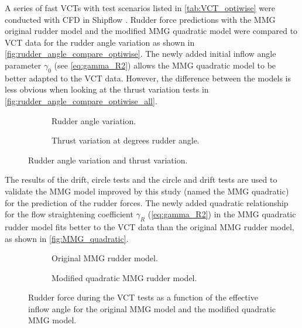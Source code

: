 \noindent A series of fast VCTs with test scenarios listed in \autoref{tab:VCT_optiwise} were conducted with CFD in Shipflow \citep{alexanderssonVirtualCaptiveTests2017}. Rudder force predictions with the MMG original rudder model and the modified MMG quadratic model were compared to VCT data for the rudder angle variation as shown in \autoref{fig:rudder_angle_compare_optiwise}. The newly added initial inflow angle parameter $\gamma_0$ (see \autoref{eq:gamma_R2}) allows the MMG quadratic model to be better adapted to the VCT data. However, the difference between the models is less obvious when looking at the thrust variation tests in \autoref{fig:rudder_angle_compare_optiwise_all}.
\begin{figure}[h]
     \centering
     \begin{subfigure}[b]{0.49\textwidth}
         \centering
         
        \caption{Rudder angle variation.}
        \label{fig:rudder_angle_compare_optiwise}
     \end{subfigure}
     \hfill
     \begin{subfigure}[b]{0.49\textwidth}
         \centering
         
        \caption{Thrust variation at  degrees rudder angle.}
        \label{fig:thrust_variation_optiwise}
     \end{subfigure}
    \caption{Rudder angle variation and thrust variation.}
    \label{fig:rudder_angle_compare_optiwise_all}
\end{figure}
\FloatBarrier

The results of the drift, circle tests and the circle and drift tests are used to validate the MMG model improved by this study (named the MMG quadratic) for the prediction of the rudder forces.
The newly added quadratic relationship for the flow straightening coefficient $\gamma_R$ (\autoref{eq:gamma_R2}) in the MMG quadratic rudder model fits better to the VCT data than the original MMG rudder model, as shown in \autoref{fig:MMG_quadratic}.
\begin{figure}[h]
     \centering
     \begin{subfigure}[b]{0.49\textwidth}
         \centering
         
        \caption{Original MMG rudder model.}
        \label{fig:Y_R_MMG_original}
     \end{subfigure}
     \hfill
     \begin{subfigure}[b]{0.49\textwidth}
         \centering
         
        \caption{Modified quadratic MMG rudder model.}
        \label{fig:Y_R_MMG_quadratic}
     \end{subfigure}
    \caption{Rudder force during the VCT tests as a function of the effective inflow angle for the original MMG model and the modified quadratic MMG model.}
    \label{fig:MMG_quadratic}
\end{figure}

